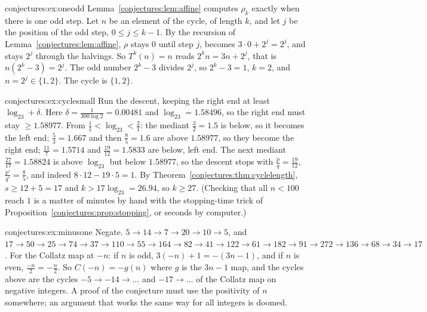 \begin{solution}{conjectures:ex:oneodd}
\idea Lemma~\ref{conjectures:lem:affine} computes $\rho_k$ exactly when there is one odd step.
\writeup Let $n$ be an element of the cycle, of length $k$, and let $j$ be the position of the odd step, $0\le j\le k-1$. By the recursion of
Lemma~\ref{conjectures:lem:affine}, $\rho$ stays $0$ until step $j$, becomes $3\cdot0+2^j=2^j$, and stays $2^j$ through the halvings. So $T^k(n)=n$ reads
$2^kn=3n+2^j$, that is $n(2^k-3)=2^j$. The odd number $2^k-3$ divides $2^j$, so $2^k-3=1$, $k=2$, and $n=2^j\in\{1,2\}$. The cycle is $\{1,2\}$.
\end{solution}

\begin{solution}{conjectures:ex:cyclesmall}
\idea Run the descent, keeping the right end at least $\log_23+\delta$.
\writeup Here $\delta=\frac1{300\log2}=0.00481$ and $\log_23=1.58496$, so the right end must stay $\ge1.58977$. From $\frac11<\log_23<\frac21$: the mediant
$\frac32=1.5$ is below, so it becomes the left end; $\frac53=1.667$ and then $\frac85=1.6$ are above $1.58977$, so they become the right end;
$\frac{11}7=1.5714$ and $\frac{19}{12}=1.5833$ are below, left end. The next mediant $\frac{27}{17}=1.58824$ is above $\log_23$ but below $1.58977$, so the
descent stops with $\frac pq=\frac{19}{12}$, $\frac{p'}{q'}=\frac85$, and indeed $8\cdot12-19\cdot5=1$. By Theorem~\ref{conjectures:thm:cyclelength}, $s\ge12+5=17$ and
$k>17\log_23=26.94$, so $k\ge27$. (Checking that all $n<100$ reach $1$ is a matter of minutes by hand with the stopping-time trick of
Proposition~\ref{conjectures:prop:stopping}, or seconds by computer.)
\end{solution}

\begin{solution}{conjectures:ex:minusone}
\idea Negate.
\writeup $5\to14\to7\to20\to10\to5$, and $17\to50\to25\to74\to37\to110\to55\to164\to82\to41\to122\to61\to182\to91\to272\to136\to68\to34\to17$. For the
Collatz map at $-n$: if $n$ is odd, $3(-n)+1=-(3n-1)$, and if $n$ is even, $\frac{-n}2=-\frac n2$. So $C(-n)=-g(n)$ where $g$ is the $3n-1$ map, and
the cycles above are the cycles $-5\to-14\to\dots$ and $-17\to\dots$ of the Collatz map on negative integers. A proof of the conjecture must use the
positivity of $n$ somewhere; an argument that works the same way for all integers is doomed.
\end{solution}

